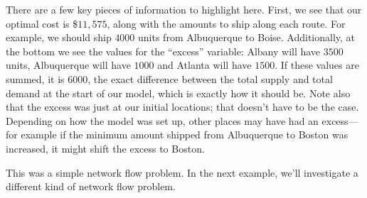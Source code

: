 \documentclass{article}
\begin{document}
There are a few key pieces of information to highlight here.  First, we see that our optimal cost is \$$11,575$, along with the amounts to ship along each route.  For example, we should ship $4000$ units from Albuquerque to Boise.  Additionally, at the bottom we see the values for the ``excess'' variable: Albany will have $3500$ units, Albuquerque will have $1000$ and Atlanta will have $1500$.  If these values are summed, it is $6000$, the exact difference between the total supply and total demand at the start of our model, which is exactly how it should be.  Note also that the excess was just at our initial locations; that doesn't have to be the case.  Depending on how the model was set up, other places may have had an excess---for example if the minimum amount shipped from Albuquerque to Boston was increased, it might shift the excess to Boston.

This was a simple network flow problem.  In the next example, we'll investigate a different kind of network flow problem.
\end{document}
